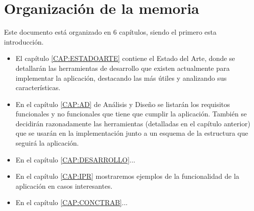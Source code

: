   \section{Organización de la memoria\label{SEC:ORGANIZACION}}
    Este documento está organizado en 6 capítulos, siendo el primero esta introducción. 
    \begin{itemize}
      \item El capítulo \ref{CAP:ESTADOARTE} contiene el Estado del Arte, donde se detallarán las herramientas de desarrollo que existen actualmente para implementar la aplicación, destacando las más útiles y analizando sus características.
      \item En el capítulo \ref{CAP:AD} de Análisis y Diseño se listarán los requisitos funcionales y no funcionales que tiene que cumplir la aplicación. También se decidirán razonadamente las herramientas (detalladas en el capítulo anterior) que se usarán en la implementación junto a un esquema de la estructura que seguirá la aplicación.
      \item En el capítulo \ref{CAP:DESARROLLO}...
      \item En el capítulo \ref{CAP:IPR} mostraremos ejemplos de la funcionalidad de la aplicación en casos interesantes.
      \item En el capítulo \ref{CAP:CONCTRAB}...
    \end{itemize}
    
    
